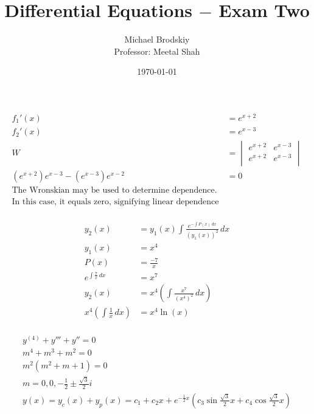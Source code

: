 \documentclass[12pt]{article}
\title{Differential Equations $-$ Exam Two}
\date{\today}
\author{Michael Brodskiy\\ \small Professor: Meetal Shah}
\begin{document}
\maketitle

\hline
\begin{equation}
  \begin{split}
    f_1'(x)&=e^{x+2}\\
    f_2'(x)&=e^{x-3}\\
    W&=\begin{vmatrix} e^{x+2} & e^{x-3} \\ e^{x+2} & e^{x-3}\\  \end{vmatrix}\\
    \left( e^{x+2} \right)e^{x-3}-\left( e^{x-3} \right)e^{x-2}&=0\\
  \text{The Wronskian may be used to determine dependence. } \\
  \text{In this case, it equals zero, signifying linear dependence}\\
  \end{split}
  \label{1}
\end{equation}
\hline

\begin{equation}
  \begin{split}
    y_2(x)&=y_1(x)\int\frac{e^{-\int P(x)\,dx}}{(y_1(x))^2}\,dx\\
    y_1(x)&=x^4\\
    P(x)&=\frac{-7}{x}\\
    e^{\int \frac{7}{x}\,dx}&=x^7\\
    y_2(x)&=x^4\left( \int \frac{x^7}{(x^4)^2}\,dx \right)\\
    x^4\left( \int \frac{1}{x}\,dx \right)&=x^4\ln(x)\\
  \end{split}
  \label{2}
\end{equation}

\hline
\begin{equation}
  \begin{split}
    y^{(4)}+y'''+y''=0\\
    m^4+m^3+m^2=0\\
    m^2(m^2+m+1)=0\\
    m=0,0,-\frac{1}{2}\pm\frac{\sqrt{3}}{2}i\\
    y(x)=y_c(x)+y_p(x)=c_1+c_2x+e^{-\frac{1}{2}x}\left( c_3\sin \frac{\sqrt{3}}{2}x + c_4\cos \frac{\sqrt{3}}{2}x \right)\\
  \end{split}
  \label{3}
\end{equation}
\end{document}

